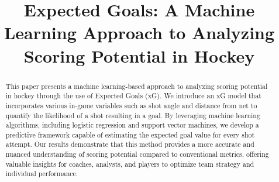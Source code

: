 \documentclass{article}
\title{Expected Goals: A Machine Learning Approach to Analyzing Scoring Potential in Hockey}
\begin{document}
\maketitle

\begin{abstract}
This paper presents a machine learning-based approach to analyzing scoring potential in hockey through the use of Expected Goals (xG). We introduce an xG model that incorporates various in-game variables such as shot angle and distance from net to quantify the likelihood of a shot resulting in a goal. By leveraging machine learning algorithms, including logistic regression and support vector machines, we develop a predictive framework capable of estimating the expected goal value for every shot attempt. Our results demonstrate that this method provides a more accurate and nuanced understanding of scoring potential compared to conventional metrics, offering valuable insights for coaches, analysts, and players to optimize team strategy and individual performance. 
\end{abstract}














\end{document}
